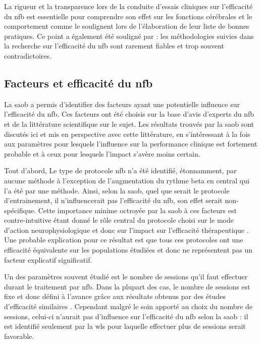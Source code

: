 La rigueur et la transparence lors de la conduite d'essais cliniques sur l'efficacité
du \gls{nfb} est essentielle pour comprendre son effet sur les fonctions cérébrales et le comportement comme le soulignent \citet{Ros2019} lors de l'élaboration
de leur liste de bonnes pratiques. Ce point a également été souligné par \citet{Rogala2016} : les méthodologies suivies dans la recherche sur l'efficacité du
\gls{nfb} sont rarement fiables et trop souvent contradictoires.

\subsection{Facteurs et efficacité du \gls{nfb}}

La \gls{saob} a permis d'identifier des facteurs ayant une potentielle influence sur l'efficacité du \gls{nfb}. Ces facteurs ont été choisis sur la base d'avis d'experts
du \gls{nfb} et de la littérature scientifique sur le sujet. Les résultats trouvés par la \gls{saob} sont discutés ici et mis en perspective avec cette littérature, en s'intéressant à la fois 
aux paramètres pour lesquels l'influence sur la performance clinique est fortement probable et à ceux pour lesquels l'impact s'avère moins certain. 

Tout d'abord, Le type de protocole \gls{nfb} n'a été identifié, étonnamment, par aucune méthode à l'exception de l'augmentation du rythme beta en central qui l'a été par une méthode. 
Ainsi, selon la \gls{saob}, quel que serait le protocole d'entrainement, il n'influencerait pas l'efficacité du \gls{nfb}, son effet serait non-spécifique. Cette importance 
minime octroyée par la \gls{saob} à ces facteurs est contre-intuitive étant donné le rôle central du protocole choisi sur le mode d'action neurophysiologique 
et donc sur l'impact sur l'efficacité thérapeutique \citep{Vernon2004, Heinrich2019}. Une probable 
explication pour ce résultat est que tous ces protocoles ont une efficacité équivalente sur les populations étudiées et donc ne représentent 
pas un facteur explicatif significatif.
  
Un des paramètres souvent étudié est le nombre de sessions qu'il faut effectuer durant le traitement par \gls{nfb}. Dans la plupart des cas, le nombre 
de sessions est fixe et donc défini à l'avance grâce aux résultats obtenus par des études d'efficacité similaires \citep{Enriquez2017}. Cependant malgré le soin apporté
au choix du nombre de sessions, celui-ci n'aurait pas d'influence sur l'efficacité du \gls{nfb} selon la \gls{saob} : il est identifié seulement par la \gls{wls} pour laquelle effectuer 
plus de sessions serait favorable. 

